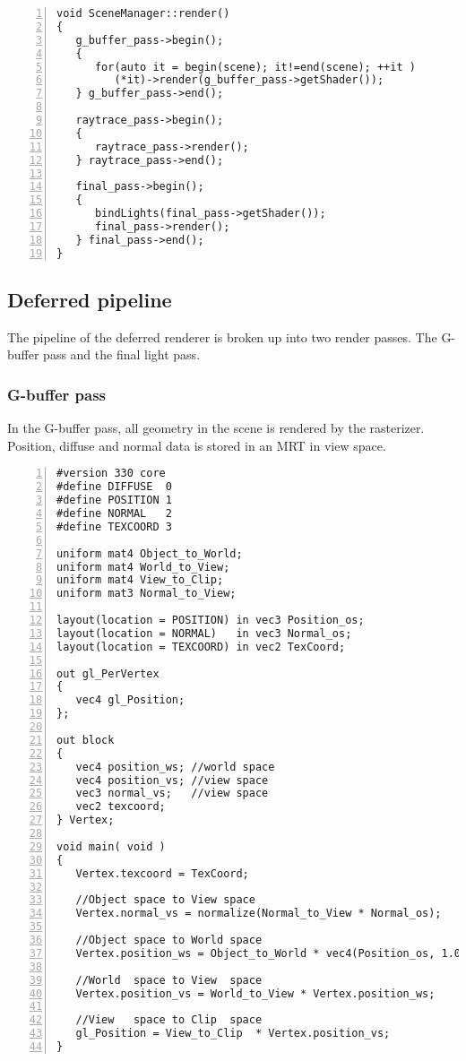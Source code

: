 \begin{Verbatim}[frame=single, numbers=left, label=Scene Manager's render implementation]
void SceneManager::render()
{
   g_buffer_pass->begin();
   {
      for(auto it = begin(scene); it!=end(scene); ++it )
         (*it)->render(g_buffer_pass->getShader());
   } g_buffer_pass->end();

   raytrace_pass->begin();
   {
      raytrace_pass->render();
   } raytrace_pass->end();

   final_pass->begin();
   {
      bindLights(final_pass->getShader());
      final_pass->render();
   } final_pass->end();
}
\end{Verbatim}

\subsection{Deferred pipeline}
The pipeline of the deferred renderer is broken up into two render passes. The G-buffer pass and the final light pass.

\subsubsection{G-buffer pass}
In the G-buffer pass, all geometry in the scene is rendered by the rasterizer. Position, diffuse and normal data is stored in an MRT in view space.

\begin{Verbatim}[frame=single, numbers=left, label=G-buffer vertex shader]
#version 330 core
#define DIFFUSE  0
#define POSITION 1
#define NORMAL   2
#define TEXCOORD 3

uniform mat4 Object_to_World;
uniform mat4 World_to_View;
uniform mat4 View_to_Clip;
uniform mat3 Normal_to_View;

layout(location = POSITION) in vec3 Position_os;
layout(location = NORMAL)   in vec3 Normal_os;
layout(location = TEXCOORD) in vec2 TexCoord;

out gl_PerVertex
{
   vec4 gl_Position;
};

out block
{
   vec4 position_ws; //world space
   vec4 position_vs; //view space
   vec3 normal_vs;   //view space
   vec2 texcoord;
} Vertex;

void main( void )
{	
   Vertex.texcoord = TexCoord;
	
   //Object space to View space
   Vertex.normal_vs = normalize(Normal_to_View * Normal_os);
	
   //Object space to World space
   Vertex.position_ws = Object_to_World * vec4(Position_os, 1.0);
	
   //World  space to View  space
   Vertex.position_vs = World_to_View * Vertex.position_ws;
	
   //View   space to Clip  space
   gl_Position = View_to_Clip  * Vertex.position_vs;
}
\end{Verbatim}

